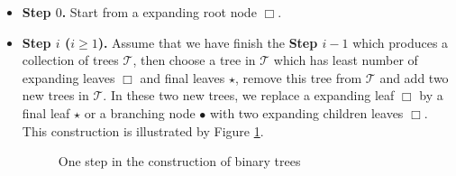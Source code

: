\begin{itemize}
    \item \textbf{Step $0$.} Start from a expanding root node $\Box$.
    
    \item \textbf{Step $i$ ($i\ge 1$).} Assume that we have finish the \textbf{Step $i-1$} which produces a collection of trees $\mathscr{T}$, then choose a tree in $\mathscr{T}$ which has least number of expanding leaves $\Box$ and final leaves $\star$, remove this tree from $\mathscr{T}$ and add two new trees in $\mathscr{T}$. In these two new trees, we replace a expanding leaf $\Box$ by a final leaf $\star$ or a branching node $\bullet$ with two expanding children leaves $\Box$. This construction is illustrated by Figure \ref{fig.construction}.
    \begin{figure}[H]
    \centering
    \caption{One step in the construction of binary trees}
    \label{fig.construction}
    \end{figure}
    


\end{itemize}
